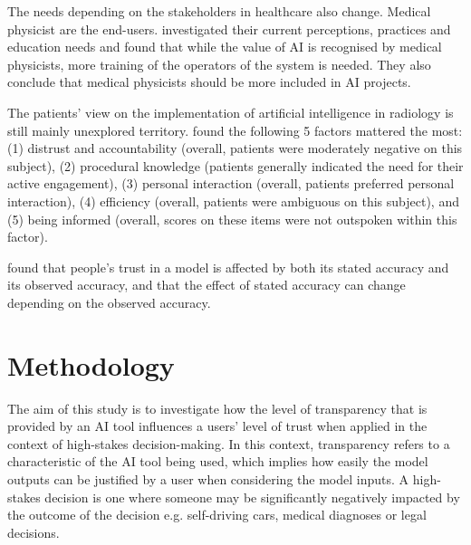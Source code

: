 \documentclass[manuscript,screen,review]{acmart}
\begin{document}
The needs depending on the stakeholders in healthcare also change.
Medical physicist are the end-users.
\cite{Diaz2021} investigated their current perceptions, practices and education needs and found that while the value of AI is recognised by medical physicists, more training of the operators of the system is needed.
They also conclude that medical physicists should be more included in AI projects.

The patients' view on the implementation of artificial intelligence in radiology is still mainly unexplored territory.
\cite{Ongena2020} found the following 5 factors mattered the most: (1) distrust and accountability (overall, patients were moderately negative on this subject), (2) procedural knowledge (patients generally indicated the need for their active engagement), (3) personal interaction (overall, patients preferred personal interaction), (4) efficiency (overall, patients were ambiguous on this subject), and (5) being informed (overall, scores on these items were not outspoken within this factor).

\cite{Yin2019} found that people's trust in a model is affected by both its stated accuracy and its observed accuracy, and that the effect of stated accuracy can change depending on the observed accuracy.

    
\newpage
\section{Methodology}\label{sec:methodology}


The aim of this study is to investigate how the level of transparency that is provided by an AI tool influences a users' level of trust when applied in the context of high-stakes decision-making. In this context, transparency refers to a characteristic of the AI tool being used, which implies how easily the model outputs can be justified by a user when considering the model inputs. A high-stakes decision is one where someone may be significantly negatively impacted by the outcome of the decision e.g. self-driving cars, medical diagnoses or legal decisions.\\
\end{document}
